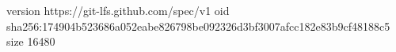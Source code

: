 version https://git-lfs.github.com/spec/v1
oid sha256:174904b523686a052eabe826798be092326d3bf3007afcc182e83b9cf48188c5
size 16480
